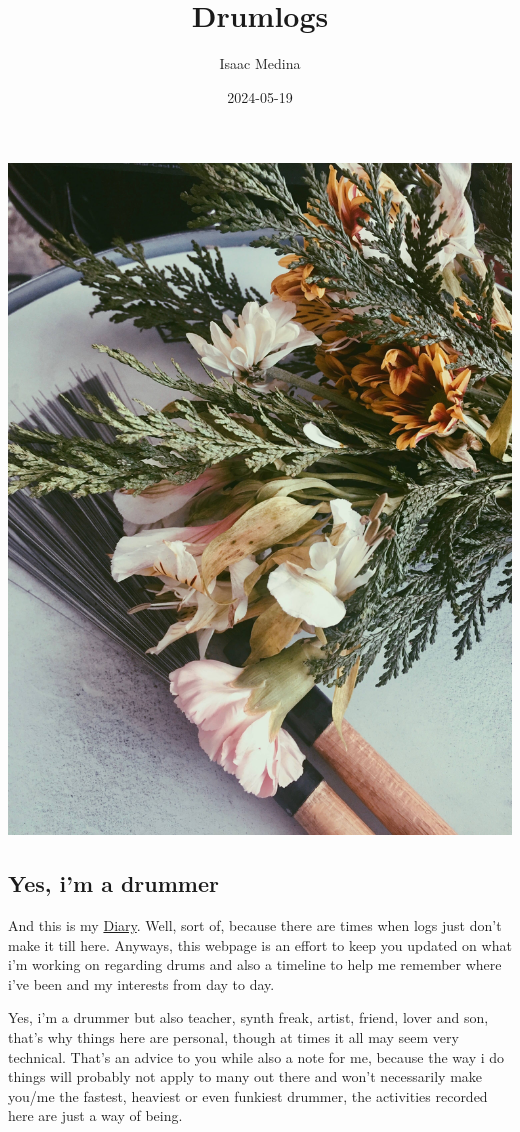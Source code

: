 \documentclass[
]{book}
\title{Drumlogs}
\author{Isaac Medina}
\date{2024-05-19}
\begin{document}
\maketitle

{
\setcounter{tocdepth}{1}
\tableofcontents
}
\chapter*{}\label{section}

\begin{center}\includegraphics[width=0.6\linewidth]{images/flowerBrush1} \end{center}

\section*{Yes, i'm a drummer}\label{yes-im-a-drummer}

And this is my \hyperref[Diary]{Diary}. Well, sort of, because there are times when logs just don't make it till here. Anyways, this webpage is an effort to keep you updated on what i'm working on regarding drums and also a timeline to help me remember where i've been and my interests from day to day.

Yes, i'm a drummer but also teacher, synth freak, artist, friend, lover and son, that's why things here are personal, though at times it all may seem very technical. That's an advice to you while also a note for me, because the way i do things will probably not apply to many out there and won't necessarily make you/me the fastest, heaviest or even funkiest drummer, the activities recorded here are just a way of being.
\end{document}
